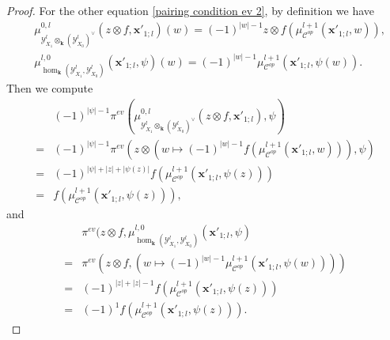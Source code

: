 \documentclass[10pt,a4paper]{amsart}
\def\K{{\mathbf{k}}}
\def\Y{\mathcal{Y}}
\def\cc{\mathcal{C}}
\begin{document}
\begin{proof}
For the other equation \eqref{pairing condition ev 2},
by definition we have
\begin{align}
& \mu_{\Y^{l}_{X_{1}} \otimes_{\K} (\Y^{l}_{X_{0}})^{\vee}}^{0, l}(z \otimes f, \mathbf{x}'_{1;l})(w) = (-1)^{|w|-1} z \otimes f(\mu_{\cc^{op}}^{l+1}(\mathbf{x}'_{1;l}, w)), \\
& \mu_{\hom_{\K}(\Y^{l}_{X_{1}}, \Y^{l}_{X_{0}})}^{l, 0}(\mathbf{x}'_{1;l}, \psi)(w) = (-1)^{ |w| -1} \mu^{l+1}_{\cc^{op}}(\mathbf{x}'_{1;l}, \psi(w)). 
\end{align}
Then we compute
\begin{equation}
\begin{split}
& (-1)^{|\psi|-1} \pi^{ev}(\mu_{\Y^{l}_{X_{1}} \otimes_{\K} (\Y^{l}_{X_{0}})^{\vee}}^{0, l}(z \otimes f, \mathbf{x}'_{1;l}), \psi) \\
= & (-1)^{|\psi|-1} \pi^{ev}(z \otimes (w \mapsto (-1)^{|w|-1} f(\mu_{\cc^{op}}^{l+1}(\mathbf{x}'_{1;l}, w))), \psi) \\
= & (-1)^{|\psi| + |z| + |\psi(z)|} f(\mu_{\cc^{op}}^{l+1}(\mathbf{x}'_{1;l}, \psi(z)))\\
= & f(\mu_{\cc^{op}}^{l+1}(\mathbf{x}'_{1;l}, \psi(z))),
\end{split}
\end{equation}
and
\begin{equation}
\begin{split}
& \pi^{ev}(z \otimes f, \mu_{\hom_{\K}(\Y^{l}_{X_{1}}, \Y^{l}_{X_{0}})}^{l, 0}(\mathbf{x}'_{1;l}, \psi) \\
= & \pi^{ev}(z \otimes f, (w \mapsto (-1)^{ |w| - 1} \mu^{l+1}_{\cc^{op}}(\mathbf{x}'_{1;l}, \psi(w)))) \\
= & (-1)^{|z| + |z| -1} f(\mu_{\cc^{op}}^{l+1}(\mathbf{x}'_{1;l}, \psi(z))) \\
= & (-1)^{1} f(\mu_{\cc^{op}}^{l+1}(\mathbf{x}'_{1;l}, \psi(z))).
\end{split}
\end{equation}
\end{proof}
\end{document}
